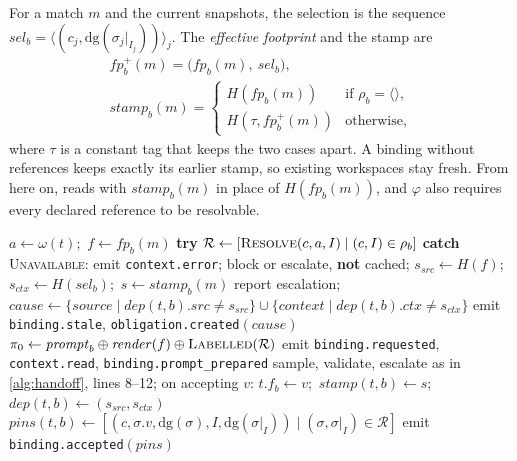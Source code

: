 \documentclass[10pt,conference]{IEEEtran}
\theoremstyle{definition}
\newcommand{\code}[1]{\texttt{#1}}
\newcommand{\fp}{\mathit{fp}}
\newcommand{\dig}{\mathrm{dg}}
\newcommand{\sel}{\mathit{sel}}
\begin{document}
For a match $m$ and the current snapshots, the selection is the sequence
$\sel_b=\langle(c_j,\dig(\sigma_j|_{I_j}))\rangle_j$. The \emph{effective footprint} and the stamp are
\begin{gather}
\fp^{+}_b(m)=\bigl(\fp_b(m),\ \sel_b\bigr),\nonumber\\
\mathit{stamp}_b(m)=\begin{cases} H(\fp_b(m)) & \text{if }\rho_b=\langle\rangle,\\ H(\tau,\fp^{+}_b(m)) & \text{otherwise,}\end{cases}
\label{eq:stamp}
\end{gather}
where $\tau$ is a constant tag that keeps the two cases apart. A binding without references keeps exactly its
earlier stamp, so existing workspaces stay fresh. From here on,  reads with
$\mathit{stamp}_b(m)$ in place of $H(\fp_b(m))$, and $\varphi$ also requires every declared reference to be
resolvable.

\begin{algorithm}[t]
\caption{A stochastic binding with pinned context (replaces lines 4--12 of \cref{alg:handoff})}
\label{alg:pin}
\small
\begin{algorithmic}[1]
  \State $a\gets\omega(t)$;\ $f\gets\fp_b(m)$ 
  \State \textbf{try} $\mathcal{R}\gets[\Call{Resolve}{c,a,I}\mid(c,I)\in\rho_b]$
  \State \textbf{catch} \textsc{Unavailable}: emit \code{context.error}; block or escalate,
         \textbf{not} cached; \Return {}
  \State $s_{\mathit{src}}\gets H(f)$;\ $s_{\mathit{ctx}}\gets H(\sel_b)$;\ $s\gets\mathit{stamp}_b(m)$
   \Return {}
  \EndIf
   report escalation; \Return
  \EndIf
   
    \State $\mathit{cause}\gets\{\mathit{source}\mid \mathit{dep}(t,b).\mathit{src}\neq s_{\mathit{src}}\}
           \cup\{\mathit{context}\mid \mathit{dep}(t,b).\mathit{ctx}\neq s_{\mathit{ctx}}\}$
    \State emit \code{binding.stale}, \code{obligation.created}$(\mathit{cause})$
  \EndIf
  \State $\pi_0\gets\mathit{prompt}_b\oplus\mathit{render}(f)\oplus\Call{Labelled}{\mathcal{R}}$
  \State emit \code{binding.requested}, \code{context.read}, \code{binding.prompt\_prepared}
  \State sample, validate, escalate as in \cref{alg:handoff}, lines 8--12; on accepting $v$:
  \State \quad $t.f_b\gets v$;\ $\mathit{stamp}(t,b)\gets s$;\ $\mathit{dep}(t,b)\gets(s_{\mathit{src}},s_{\mathit{ctx}})$
  \State \quad $\mathit{pins}(t,b)\gets[(c,\sigma.v,\dig(\sigma),I,\dig(\sigma|_I))\mid(\sigma,\sigma|_I)\in\mathcal{R}]$
  \State \quad emit \code{binding.accepted}$(\mathit{pins})$
\EndFunction
\end{algorithmic}
\end{algorithm}
\end{document}
